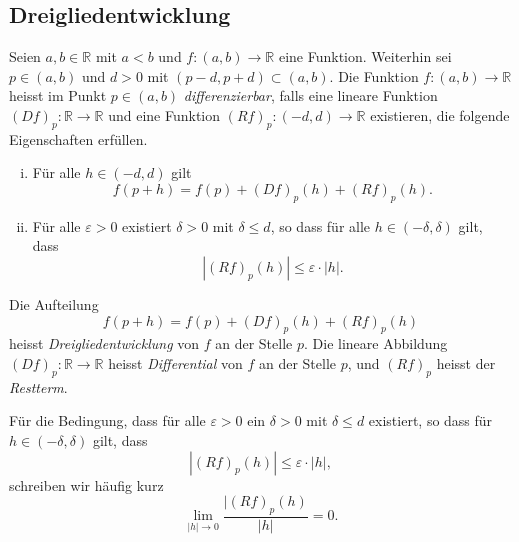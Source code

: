 \documentclass[../main.tex]{subfiles}
\begin{document}
\subsection*{Dreigliedentwicklung}
\begin{definition}
  Seien $a, b \in \mathbb{R}$ 
  mit $a < b$ und
  $f \colon (a, b) \to \mathbb{R}$ 
  eine Funktion.
  Weiterhin sei $p \in (a, b)$ und
  $d > 0$ 
  mit $(p - d, p + d) \subset (a, b)$.
  Die Funktion $f \colon (a, b) \to \mathbb{R}$ 
  heisst im Punkt
  $p \in (a, b)$ \emph{differenzierbar},
  falls eine lineare Funktion
  ${(Df)}_p \colon\mathbb{R} \to \mathbb{R}$
  und eine Funktion ${(Rf)}_p \colon (-d, d) \to \mathbb{R}$ 
  existieren, die folgende Eigenschaften erfüllen.
  \begin{enumerate}[(i)]
    \item Für alle $h \in (-d, d)$ gilt
      \[
        f(p + h) = f(p) + {(Df)}_p(h) + {(Rf)}_p(h).
      \]
    \item Für alle $\varepsilon > 0$ existiert
      $\delta > 0$ mit $\delta \leq d$, so dass
      für alle $h \in (- \delta, \delta)$ gilt,
      dass
      \[
        |{(Rf)}_p(h)| \leq \varepsilon \cdot |h|.
      \]
   \end{enumerate}
   Die Aufteilung
   \[
     f(p + h) = f(p) + {(Df)}_p(h) + {(Rf)}_p(h)
   \]
   heisst \emph{Dreigliedentwicklung} von $f$ 
   an der Stelle $p$.
   Die lineare Abbildung
   ${(Df)}_p \colon\mathbb{R} \to \mathbb{R}$ heisst
   \emph{Differential} von $f$ an der Stelle $p$,
   und ${(Rf)}_p$ heisst der \emph{Restterm}.
\end{definition}

Für die Bedingung, dass für
alle $\varepsilon > 0$ ein $\delta > 0$ 
mit $\delta \leq d$ existiert,
so dass für $h \in (-\delta, \delta)$ gilt,
dass
\[
  |{(Rf)}_p(h)| \leq \varepsilon \cdot |h|,
\]
schreiben wir häufig kurz
\[
  \lim_{|h| \to 0} \frac{|{(Rf)}_p(h)}{|h|} = 0.
\]
\end{document}
